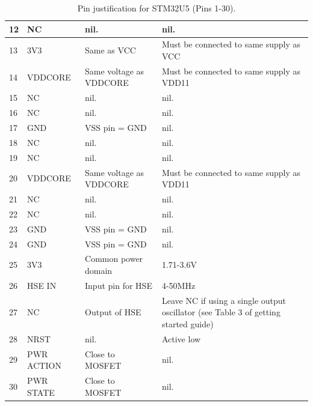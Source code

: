 \begin{table}[H]
\begin{tabular}{|l|p{3cm}|p{6cm}|p{4.5cm}|}
        12 & NC & nil. & nil. \\ \hline
        13 & 3V3 & Same as VCC & Must be connected to same supply as VCC \\ \hline
        14 & VDDCORE & Same voltage as VDDCORE & Must be connected to same supply as VDD11 \\ \hline
        15 & NC & nil. & nil. \\ \hline
        16 & NC & nil. & nil. \\ \hline
        17 & GND & VSS pin = GND & nil. \\ \hline
        18 & NC & nil. & nil. \\ \hline
        19 & NC & nil. & nil. \\ \hline
        20 & VDDCORE & Same voltage as VDDCORE & Must be connected to same supply as VDD11 \\ \hline
        21 & NC & nil. & nil. \\ \hline
        22 & NC & nil. & nil. \\ \hline
        23 & GND & VSS pin = GND & nil. \\ \hline
        24 & GND & VSS pin = GND & nil. \\ \hline
        25 & 3V3 & Common power domain & 1.71-3.6V \\ \hline
        26 & HSE IN & Input pin for HSE & 4-50MHz \\ \hline
        27 & NC & Output of HSE & Leave NC if using a single output oscillator (see Table 3 of getting started guide) \\ \hline
        28 & NRST & nil. & Active low \\ \hline
        29 & PWR ACTION & Close to MOSFET & nil. \\ \hline
        30 & PWR STATE & Close to MOSFET & nil. \\ \hline
    \end{tabular}
    \caption{Pin justification for STM32U5 (Pins 1-30).}
    \label{tab:stm32u5-pin-justification}
\end{table}

